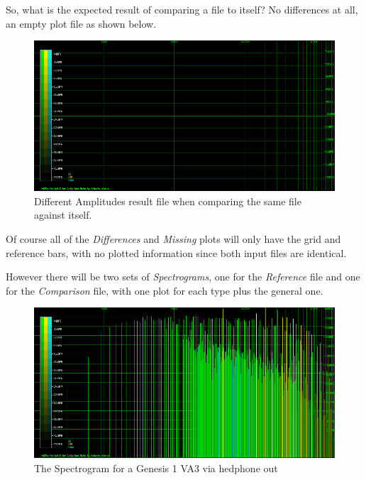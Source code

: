 \documentclass[10pt,a4paper]{report}
\begin{document}
So, what is the expected result of comparing a file to itself? No differences at all, an empty plot file as shown below.

\begin{figure}[H]
	\centering
	\includegraphics[width=1.0\linewidth]{plots/Plot1-SameFile.png}
	\caption[Same file compared]{Different Amplitudes result file when comparing the same file against itself.}
	\label{fig:plot1-samefile}
\end{figure}

Of course all of the \textit{Differences} and \textit{Missing} plots will only have the grid and reference bars, with no plotted information since both input files are identical. 

However there will be two sets of \textit{Spectrograms}, one for the \textit{Reference} file and one for the \textit{Comparison} file, with one plot for each type plus the general one.

\begin{figure}[H]
	\centering
	\includegraphics[width=1.0\linewidth]{plots/Plot2-SameFile-FM-Spectrogram.png}
	\caption[Spectrogram]{The Spectrogram for a Genesis 1 VA3 via hedphone out}
	\label{fig:plot2-samefile-fm-spectrogram}
\end{figure}
\end{document}
